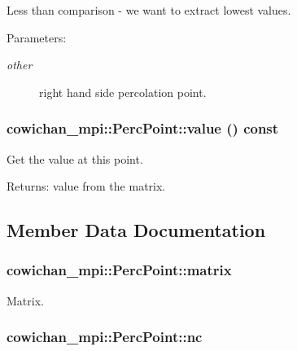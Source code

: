 Less than comparison - we want to extract lowest values. \begin{Desc}
\item[Parameters:]
\begin{description}
\item[{\em other}]right hand side percolation point. \end{description}
\end{Desc}
\hypertarget{classcowichan__mpi_1_1_perc_point_aa17cfbf6f592c70921c009cd735056c}{
\subsubsection[{value}]{ cowichan\_\-mpi::PercPoint::value () const}}
\label{classcowichan__mpi_1_1_perc_point_aa17cfbf6f592c70921c009cd735056c}


Get the value at this point. \begin{Desc}
\item[Returns:]value from the matrix. \end{Desc}


\subsection{Member Data Documentation}
\hypertarget{classcowichan__mpi_1_1_perc_point_0469972f0ba029e73a95744af5b1cb79}{
\subsubsection[{matrix}]{ {\bf cowichan\_\-mpi::PercPoint::matrix}}}
\label{classcowichan__mpi_1_1_perc_point_0469972f0ba029e73a95744af5b1cb79}


Matrix. \hypertarget{classcowichan__mpi_1_1_perc_point_f6ef42cb2b4cc4598766150abf60d6b9}{
\subsubsection[{nc}]{ {\bf cowichan\_\-mpi::PercPoint::nc}}}
\label{classcowichan__mpi_1_1_perc_point_f6ef42cb2b4cc4598766150abf60d6b9}


